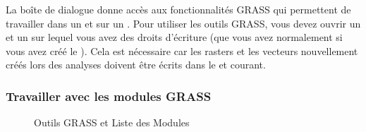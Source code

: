 La boîte de dialogue  donne accès aux fonctionnalités GRASS qui permettent de travailler dans un  et sur un . Pour utiliser les outils GRASS, vous devez ouvrir un  et un  sur lequel vous avez des droits d'écriture (que vous avez normalement si vous avez créé le ). Cela est nécessaire car les rasters et les vecteurs nouvellement créés lors des analyses doivent être écrits dans le  et  courant.


\subsubsection{Travailler avec les modules GRASS} 

\begin{figure}[h]
\centering
\caption{Outils GRASS et Liste des Modules \nixcaption}\label{fig:grass_modules}
   \goodgap
\end{figure}

